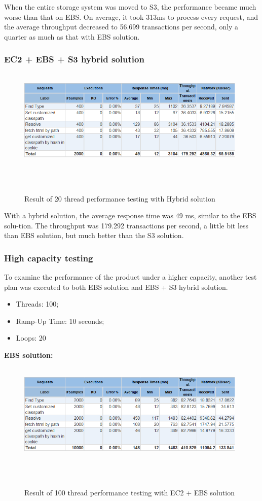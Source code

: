 \documentclass[runningheads]{llncs}
\begin{document}
When the entire storage system was moved to S3, the performance became much worse than that on EBS. On average, it took 313ms to process every request, and the average throughput decreased to 56.699 transactions per second, only a quarter as much as that with EBS solution.

\subsubsection{EC2 + EBS + S3 hybrid solution}
\begin{figure}[H]
    \centering
    \includegraphics[width=11cm]{pic/jmeter-hybrid.png}
    \caption{Result of 20 thread performance testing with Hybrid solution}
    \label{Result of 20 thread performance testing with Hybrid solution}
\end{figure}

With a hybrid solution, the average response time was 49 ms, similar to the EBS solu-tion. The throughput was 179.292 transactions per second, a little bit less than EBS solution, but much better than the S3 solution.

\subsubsection{High capacity testing}
To examine the performance of the product under a higher capacity, another test plan was executed to both EBS solution and EBS + S3 hybrid solution.

\begin{itemize}
	\item Threads: 100;
	\item Ramp-Up Time: 10 seconds;
	\item Loops: 20
\end{itemize}

\textbf{EBS solution:}
\begin{figure}[H]
    \centering
    \includegraphics[width=11cm]{pic/jmeter-100-ebs.png}
    \caption{Result of 100 thread performance testing with EC2 + EBS solution}
    \label{Result of 100 thread performance testing with EC2 + EBS solution}
\end{figure}
\end{document}
